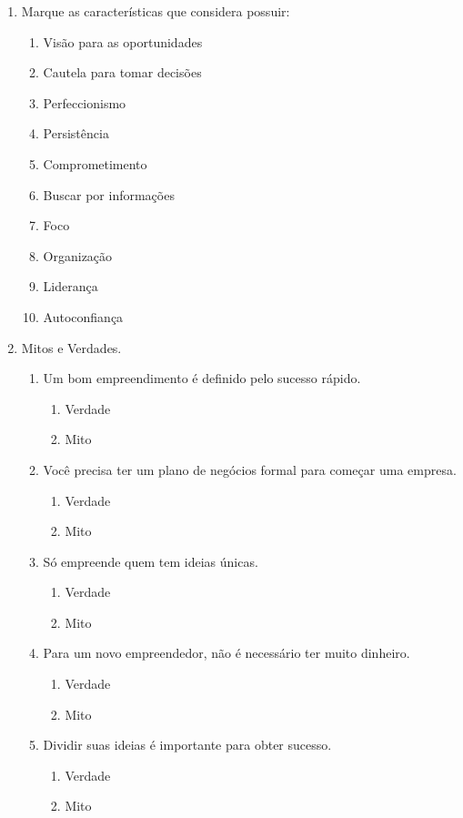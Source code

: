 \begin{enumerate}[noitemsep]
\begin{enumerate}[noitemsep]
    \end{enumerate}
    \item Marque as características que considera possuir:
    \begin{enumerate}[noitemsep]
        \item Visão para as oportunidades
        \item Cautela para tomar decisões
        \item Perfeccionismo
        \item Persistência
        \item Comprometimento
        \item Buscar por informações
        \item Foco
        \item Organização
        \item Liderança
        \item Autoconfiança
    \end{enumerate}
    \item Mitos e Verdades.
        \begin{enumerate}[noitemsep]
            \item Um bom empreendimento é definido pelo sucesso rápido.
            \begin{enumerate}[noitemsep]
                \item Verdade
                \item Mito
            \end{enumerate}
            \item Você precisa ter um plano de negócios formal para começar uma empresa.
            \begin{enumerate}[noitemsep]
                \item Verdade
                \item Mito
            \end{enumerate}
            \item Só empreende quem tem ideias únicas.
            \begin{enumerate}[noitemsep]
                \item Verdade
                \item Mito
            \end{enumerate}
            \item Para um novo empreendedor, não é necessário ter muito dinheiro.
            \begin{enumerate}[noitemsep]
                \item Verdade
                \item Mito
            \end{enumerate}
            \item Dividir suas ideias é importante para obter sucesso.
            \begin{enumerate}[noitemsep]
                \item Verdade
                \item Mito
            \end{enumerate}
        \end{enumerate}
\end{enumerate}